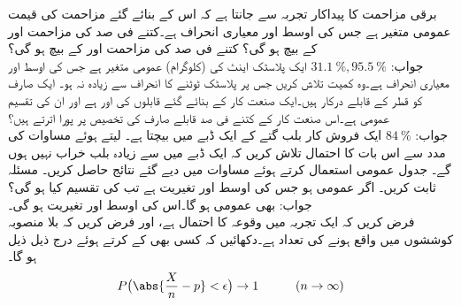 \quad
برقی مزاحمت کا پیداکار  تجربہ سے جانتا ہے کہ اس کے بنائے گئے مزاحمت کی قیمت عمومی متغیر ہے جس کی اوسط  اور معیاری انحراف  ہے۔کتنے فی صد کی مزاحمت  اور  کے بیچ ہو گی؟  کتنے فی صد کی مزاحمت  اور  کے بیچ ہو گی؟  \\
جواب:\quad
$\SI{31.1}{\percent},\SI{95.5}{\percent}$
\quad
ایک پلاسٹک اینٹ کی   (کلوگرام) عمومی متغیر ہے جس کی اوسط  اور معیاری انحراف  ہے۔وہ کمیت تلاش کریں جس پر پلاسٹک ٹوٹنے کا انحراف  سے زیادہ نہ ہو۔ 
\quad
ایک صارف کو  قطر کے قابلے درکار ہیں۔ایک صنعت کار کے بنائے گئے  قابلوں کی   اور  ہے اور ان کی تقسیم عمومی ہے۔اس صنعت کار کے کتنے فی صد قابلے صارف کی تخصیص پر پورا اترتے ہیں؟\\
جواب:\quad
$\SI{84}{\percent}$
\quad
ایک فروش کار   بلب  گتے کے ایک ڈبے میں بیچتا ہے۔   لیتے ہوئے مساوات  کی مدد سے اس بات کا احتمال تلاش کریں کہ ایک ڈبے میں  سے زیادہ بلب خراب نہیں ہوں گے۔
\quad
جدول عمومی استعمال کرتے ہوئے مساوات  میں دیے گئے نتائج حاصل کریں۔
\quad
مسئلہ  ثابت کریں۔
\quad
اگر  عمومی ہو جس کی اوسط  اور تغیریت  ہے تب  کی تقسیم کیا ہو گی؟\\
جواب:\quad
{} بھی عمومی ہو گا۔اس کی اوسط  اور تغیریت  ہو گی۔
\quad {}\\
فرض کریں کہ ایک تجربہ میں وقوعہ  کا احتمال  ہے، اور فرض کریں کہ  بلا منصوبہ کوششوں میں  واقع ہونے کی تعداد  ہے۔دکھائیں کہ کسی بھی  کے  کرتے ہوئے  درج ذیل ذیل ہو گا۔
\begin{align}
P\big(\abs{\frac{X}{n}-p}<\epsilon\big)\to  1\quad \quad \quad (n\to \infty)
\end{align}
